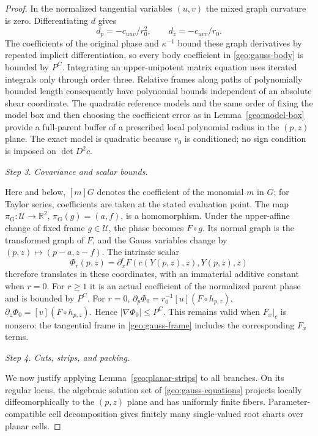 \documentclass[11pt]{amsart}
\theoremstyle{definition}
\theoremstyle{remark}
\numberwithin{equation}{section}
\begin{document}
\begin{proof}
In the normalized tangential variables $(u,v)$ the mixed graph curvature is zero. Differentiating $d$ gives
\[
d_p=-c_{uuv}/r_0^2,\qquad d_z=-c_{uvv}/r_0.
\]
The coefficients of the original phase and $\kappa^{-1}$ bound these graph derivatives by repeated implicit differentiation, so every body coefficient in \eqref{geo:gauss-body} is bounded by $P^C$. Integrating an upper-unipotent matrix equation uses iterated integrals only through order three. Relative frames along paths of polynomially bounded length consequently have polynomial bounds independent of an absolute shear coordinate. The quadratic reference models and the same order of fixing the model box and then choosing the coefficient error as in Lemma~\ref{geo:model-box} provide a full-parent buffer of a prescribed local polynomial radius in the $(p,z)$ plane. The exact model is quadratic because $r_0$ is conditioned; no sign condition is imposed on $\det D^2c$.

\par\medskip\noindent\textit{Step 3. Covariance and scalar bounds.}\par\nobreak\smallskip

Here and below, $[m]G$ denotes the coefficient of the monomial $m$ in $G$; for Taylor series, coefficients are taken at the stated evaluation point. The map $\pi_{\mathrm G}:\mathcal U\to\mathbb R^2$, $\pi_{\mathrm G}(g)=(a,f)$, is a homomorphism. Under the upper-affine change of fixed frame $g\in\mathcal U$, the phase becomes $F\circ g$. Its normal graph is the transformed graph of $F$, and the Gauss variables change by $(p,z)\mapsto(p-a,z-f)$. The intrinsic scalar
\[
\Phi_r(p,z)=\partial_x^rF(c(Y(p,z),z),Y(p,z),z)
\]
therefore translates in these coordinates, with an immaterial additive constant when $r=0$. For $r\ge1$ it is an actual coefficient of the normalized parent phase and is bounded by $P^C$. For $r=0$, $\partial_p\Phi_0=r_0^{-1}[u](F\circ h_{p,z})$, $\partial_z\Phi_0=[v](F\circ h_{p,z})$. Hence $|\nabla\Phi_0|\le P^C$. This remains valid when $F_x|_c$ is nonzero: the tangential frame in \eqref{geo:gauss-frame} includes the corresponding $F_x$ terms.

\par\medskip\noindent\textit{Step 4. Cuts, strips, and packing.}\par\nobreak\smallskip

We now justify applying Lemma~\ref{geo:planar-strips} to all branches. On its regular locus, the algebraic solution set of \eqref{geo:gauss-equations} projects locally diffeomorphically to the $(p,z)$ plane and has uniformly finite fibers. Parameter-compatible cell decomposition \cite[Theorems 5.6 and 14.16]{BPR} gives finitely many single-valued root charts over planar cells.


\end{proof}
\end{document}
